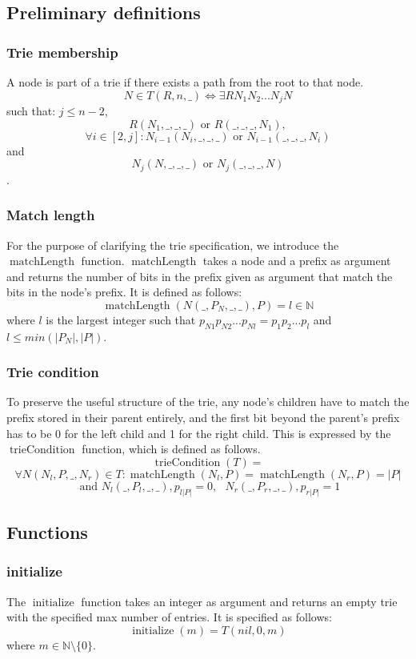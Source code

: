 \documentclass{article}
\DeclareMathOperator{\matchlength}{matchLength}
\DeclareMathOperator{\triecond}{trieCondition}
\DeclareMathOperator{\initialize}{initialize}
\begin{document}
\subsection{Preliminary definitions}
\subsubsection{Trie membership}
A node is part of a trie if there exists a path from the root to that node.
\[
    N \in T(R, n, \_) \Leftrightarrow \exists RN_1N_2...N_jN
\]
such that: $j \leq n-2$,
\[
    R(N_1, \_, \_, \_) \text{ or } R(\_, \_, \_, N_1),
\]
\[
    \forall i \in [2, j]: N_{i-1}(N_i, \_, \_, \_) \text{ or } N_{i-1}(\_, \_, \_, N_i)
\]
and
\[
    N_j(N, \_, \_, \_) \text{ or } N_j(\_, \_, \_, N)
\].
\subsubsection{Match length}
For the purpose of clarifying the trie specification, we introduce the
$\matchlength$ function. $\matchlength$ takes a node and a prefix as argument and
returns the number of bits in the prefix given as argument that match the
bits in the node's prefix. It is defined as follows:
\[
    \matchlength(N(\_, P_N, \_, \_), P) = l \in \mathbb{N}
\]
where $l$ is the largest integer such that $p_{N1}p_{N2}...p_{Nl} = p_1p_2...p_l$
and $l \leq min(|P_N|, |P|)$.
\subsubsection{Trie condition}
To preserve the useful structure of the trie, any node's children have to match
the prefix stored in their parent entirely, and the first bit beyond the
parent's prefix has to be 0 for the left child and 1 for the right child.
This is expressed by the $\triecond$ function, which is defined as follows.
\[
    \triecond(T) =
\]
\[
    \forall N(N_l, P, \_, N_r) \in T: \matchlength(N_l, P) = \matchlength(N_r, P) = |P|
\]
\[
    \text{ and } N_l(\_, P_l, \_, \_), p_{l|P|} = 0, \text{ } N_r(\_, P_r, \_, \_), p_{r|P|} = 1
\]
\subsection{Functions}
\subsubsection{initialize}
The $\initialize$ function takes an integer as argument and returns an empty trie
with the specified max number of entries. It is specified as follows:
\[
    \initialize(m) = T(nil, 0, m)
\]
where $m \in \mathbb{N} \setminus \{0\}$.
\end{document}
